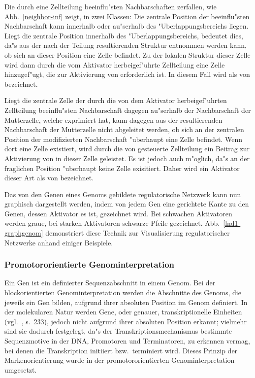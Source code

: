 Die durch eine Zellteilung beeinflu"sten Nachbarschaften zerfallen, wie Abb.\ \ref{neighbor-inf} zeigt,
in zwei Klassen: Die zentrale Position der beeinflu"sten Nachbarschaft kann innerhalb
oder au"serhalb des "Uberlappungsbereichs liegen. Liegt die zentrale Position innerhalb
des "Uberlappungsbereichs, bedeutet dies, da"s aus der nach der Teilung resultierenden Struktur
entnommen werden kann, ob sich an dieser Position eine Zelle befindet. Zu der lokalen Struktur
dieser Zelle wird dann durch die vom Aktivator  herbeigef"uhrte Zellteilung eine Zelle
hinzugef"ugt, die zur Aktivierung von  erforderlich ist. In diesem Fall wird 
als  von  bezeichnet.

Liegt die zentrale Zelle der durch die von dem Aktivator  herbeigef"uhrten Zellteilung
beeinflu"sten Nachbarschaft dagegen au"serhalb der Nachbarschaft der Mutterzelle, welche 
exprimiert hat, kann dagegen aus der resultierenden Nachbarschaft der Mutterzelle nicht abgeleitet
werden, ob sich an der zentralen Position der modifizierten Nachbarschaft "uberhaupt eine Zelle befindet.
Wenn dort eine Zelle existiert, wird durch die von  gesteuerte Zellteilung ein Beitrag
zur Aktivierung von  in dieser Zelle geleistet. Es ist jedoch auch m"oglich, da"s an
der fraglichen Position "uberhaupt keine Zelle exisitiert. Daher wird ein Aktivator dieser Art
als  von  bezeichnet.

Das von den Genen eines Genoms gebildete regulatorische Netzwerk kann nun graphisch
dargestellt werden, indem von jedem Gen eine gerichtete Kante zu den Genen, dessen
Aktivator es ist, gezeichnet wird. Bei schwachen Aktivatoren werden graue, bei starken
Aktivatoren schwarze Pfeile gezeichnet. Abb.\ \ref{lnd1-graphgenom} demonstriert diese
Technik zur Visualisierung regulatorischer Netzwerke anhand einiger Beispiele.


\subsubsection{Promotororientierte Genominterpretation}
\label{prominterdef}

Ein Gen ist ein definierter Sequenzabschnitt in einem Genom. Bei der blockorientierten
Genominterpretation werden die Abschnitte des Genoms, die jeweils ein Gen bilden, aufgrund
ihrer absoluten Position im Genom definiert. In der molekularen Natur werden Gene, oder
genauer, transkriptionelle Einheiten (vgl.\ \cite{Watson}, s.\ 233), jedoch nicht aufgrund
ihrer absoluten Position erkannt; vielmehr sind sie dadurch festgelegt, da"s der Transkriptionsmechanismus
bestimmte Sequenzmotive in der DNA, Promotoren und Terminatoren, zu erkennen vermag, bei denen die
Transkription initiiert bzw.\ terminiert wird. Dieses Prinzip der Markenorientierung wurde in
der promotororientierten Genominterpretation umgesetzt.


